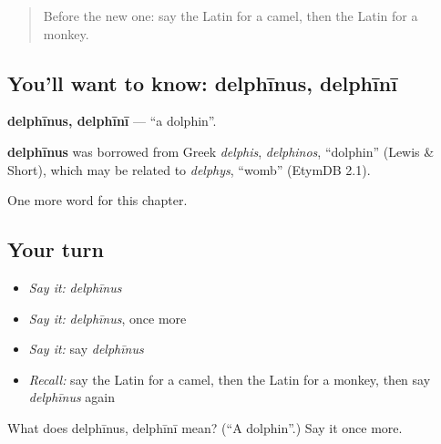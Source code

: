 \begin{quote}
Before the new one: say the Latin for a camel, then the Latin for a monkey.
\end{quote}

\subsection*{You'll want to know: delphīnus, delphīnī}
\textbf{delphīnus, delphīnī} — \textquotedblleft{}a dolphin\textquotedblright{}.

\begin{cousinweb}
\textbf{delphīnus} was borrowed from Greek \emph{delphis}, \emph{delphinos}, \textquotedblleft{}dolphin\textquotedblright{} (Lewis \& Short), which may be related to \emph{delphys}, \textquotedblleft{}womb\textquotedblright{} (EtymDB 2.1).
\end{cousinweb}

\begin{grammarlens}[title={What you've built}]
One more word for this chapter.
\end{grammarlens}

\subsection*{Your turn}
\begin{itemize}
\raggedright
  \item \emph{Say it:} \emph{delphīnus}
  \item \emph{Say it:} \emph{delphīnus}, once more
  \item \emph{Say it:} say \emph{delphīnus}
  \item \emph{Recall:} say the Latin for a camel, then the Latin for a monkey, then say \emph{delphīnus} again
\end{itemize}

\begin{tcolorbox}[breakable,colback=teal!4,colframe=teal!35!black,title={Before you move on}]
What does delphīnus, delphīnī mean? (\textquotedblleft{}A dolphin\textquotedblright{}.) Say it once more.
\end{tcolorbox}
